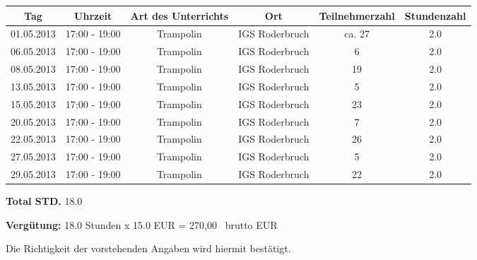 \documentclass[a4paper,10pt,BCOR=0mm]{scrreprt}
\begin{document}
\begin{flushright}
\begin{tabular}{|c|c|c|c|c|c|}\hline
 \textbf{Tag}
&
 \textbf{Uhrzeit}
&
 \textbf{Art des Unterrichts}
&
\textbf{Ort}
&
\textbf{Teilnehmerzahl}
&
 \textbf{Stundenzahl}\\\hline\hline

01.05.2013
&
17:00 - 19:00
&
Trampolin
&
IGS Roderbruch
&
ca. 27
&
2.0
\\\hline


06.05.2013
&
17:00 - 19:00
&
Trampolin
&
IGS Roderbruch
&
6
&
2.0
\\\hline


08.05.2013
&
17:00 - 19:00
&
Trampolin
&
IGS Roderbruch
&
19
&
2.0
\\\hline


13.05.2013
&
17:00 - 19:00
&
Trampolin
&
IGS Roderbruch
&
5
&
2.0
\\\hline


15.05.2013
&
17:00 - 19:00
&
Trampolin
&
IGS Roderbruch
&
23
&
2.0
\\\hline


20.05.2013
&
17:00 - 19:00
&
Trampolin
&
IGS Roderbruch
&
7
&
2.0
\\\hline


22.05.2013
&
17:00 - 19:00
&
Trampolin
&
IGS Roderbruch
&
26
&
2.0
\\\hline


27.05.2013
&
17:00 - 19:00
&
Trampolin
&
IGS Roderbruch
&
5
&
2.0
\\\hline


29.05.2013
&
17:00 - 19:00
&
Trampolin
&
IGS Roderbruch
&
22
&
2.0
\\\hline



\end{tabular} 
\begin{flushright}
\parbox{5cm}{\textbf{Total STD.} 18.0}\end{flushright}
\hfill\hfill \textbf{Vergütung:} 18.0 Stunden x 15.0 EUR = 270,00 \officialeuro\  brutto EUR \hspace*{2cm}\\
\end{flushright}
\vfill
Die Richtigkeit der vorstehenden Angaben wird hiermit bestätigt.\\
\end{document}
